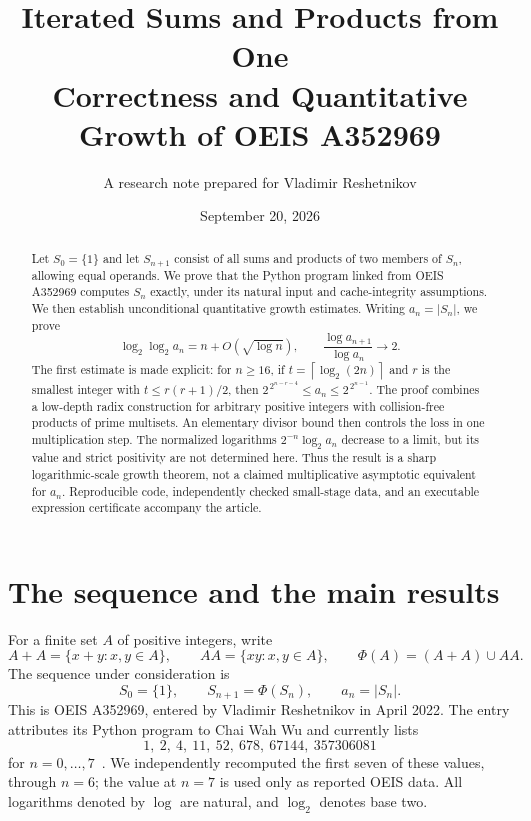 \documentclass[11pt,a4paper]{article}
\title{\textbf{Iterated Sums and Products from One}\\[0.45em]
  \large Correctness and Quantitative Growth of OEIS A352969}
\author{A research note prepared for Vladimir Reshetnikov}
\date{September 20, 2026}
\theoremstyle{definition}
\theoremstyle{remark}
\renewcommand{\lg}{\log_2}
\newcommand{\card}[1]{\lvert #1\rvert}
\newcommand{\ceil}[1]{\left\lceil #1\right\rceil}
\begin{document}
\maketitle
\begin{abstract}
Let $S_0=\{1\}$ and let $S_{n+1}$ consist of all sums and products of two
members of $S_n$, allowing equal operands. We prove that the Python program
linked from OEIS A352969 computes $S_n$ exactly, under its natural input
and cache-integrity assumptions. We then establish unconditional quantitative
growth estimates. Writing $a_n=\card{S_n}$, we prove
\[
 \lg\lg a_n=n+O(\sqrt{\log n}),\qquad
 \frac{\log a_{n+1}}{\log a_n}\longrightarrow 2.
\]
The first estimate is made explicit: for $n\ge16$, if
$t=\ceil{\lg(2n)}$ and $r$ is the smallest integer with $t\le r(r+1)/2$,
then $2^{\,2^{n-r-4}}\le a_n\le2^{\,2^{n-1}}$.
The proof combines a low-depth radix construction for arbitrary positive
integers with collision-free products of prime multisets. An elementary
divisor bound then controls the loss in one multiplication step.
The normalized logarithms $2^{-n}\lg a_n$ decrease to a limit, but its
value and strict positivity are not determined here. Thus the result is a
sharp logarithmic-scale growth theorem, not a claimed multiplicative
asymptotic equivalent for $a_n$. Reproducible code, independently checked
small-stage data, and an executable expression certificate accompany the article.
\end{abstract}

\clearpage
\tableofcontents
\clearpage

\section{The sequence and the main results}\label{sec:main}
For a finite set $A$ of positive integers, write
\[
 A+A=\{x+y:x,y\in A\},\qquad
 AA=\{xy:x,y\in A\},\qquad \Phi(A)=(A+A)\cup AA.
\]
The sequence under consideration is
\begin{equation}\label{eq:definition}
 S_0=\{1\},\qquad S_{n+1}=\Phi(S_n),\qquad a_n=\card{S_n}.
\end{equation}
This is OEIS A352969, entered by Vladimir Reshetnikov in April 2022.
The entry attributes its Python program to Chai Wah Wu and currently lists
\begin{equation}\label{eq:terms}
 1,\ 2,\ 4,\ 11,\ 52,\ 678,\ 67144,\ 357306081
\end{equation}
for $n=0,\ldots,7$~\cite{oeis}. We independently recomputed the first seven
of these values, through $n=6$; the value at $n=7$ is used only as reported
OEIS data. All logarithms denoted by $\log$ are natural, and $\lg$ denotes
base two.
\end{document}
